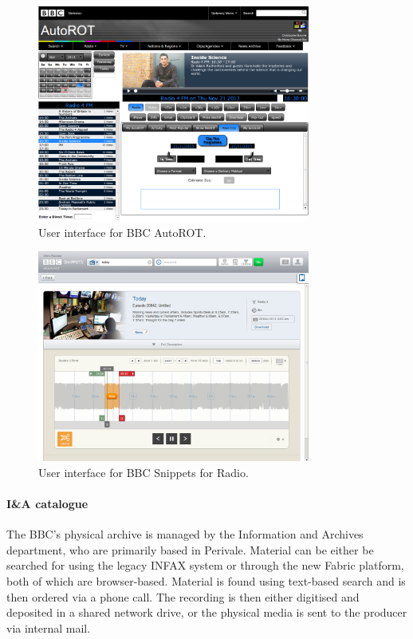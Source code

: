 \begin{figure}[p]
\centering
\includegraphics[width=0.8\textwidth]{figs/autorot.png}
\caption{User interface for BBC AutoROT.}
\label{fig:autorot}
\end{figure}

\begin{figure}[p]
\centering
\includegraphics[width=0.8\textwidth]{figs/snippets.png}
\caption{User interface for BBC Snippets for Radio.}
\label{fig:snippets}
\end{figure}

\paragraph{I\&A catalogue}
The BBC's physical archive is managed by the Information and Archives
department, who are primarily based in Perivale. Material can be either be
searched for using the legacy INFAX system or through the new Fabric platform,
both of which are browser-based. Material is found using text-based search
and is then ordered via a phone call. The recording is then either digitised
and deposited in a shared network drive, or the physical media is sent to the
producer via internal mail.

